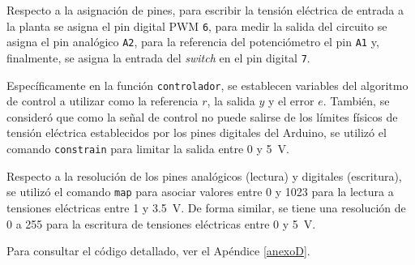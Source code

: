 Respecto a la asignación de pines, para escribir la tensión eléctrica de entrada a la planta se asigna el pin digital PWM \texttt{6}, para medir la salida del circuito se asigna el pin analógico \texttt{A2}, para la referencia del potenciómetro el pin \texttt{A1} y, finalmente, se asigna la entrada del \textit{switch} en el pin digital \texttt{7}. 

Específicamente en la función \texttt{controlador}, se establecen variables del algoritmo de control a utilizar como la referencia $r$, la salida $y$ y el error $e$.
También, se consideró que como la señal de control no puede salirse de los límites físicos de tensión eléctrica establecidos por los pines digitales del Arduino, se utilizó el comando \texttt{constrain} para limitar la salida entre 0 y \SI{5}{\volt}.

Respecto a la resolución de los pines analógicos (lectura) y digitales (escritura), se utilizó el comando \texttt{map} para asociar valores entre 0 y 1023 para la lectura a tensiones eléctricas entre 1 y \SI{3.5}{\volt}.
De forma similar, se tiene una resolución de 0 a 255 para la escritura de tensiones eléctricas entre 0 y \SI{5}{\volt}.

Para consultar el código detallado, ver el Apéndice \ref{anexoD}.
